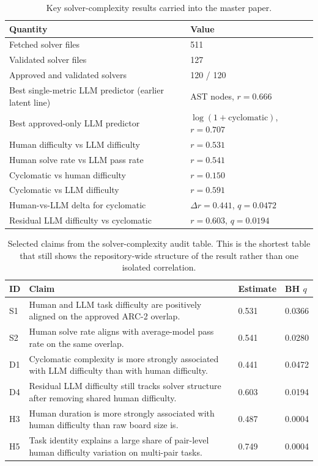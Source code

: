 \documentclass[11pt,letterpaper]{article}
\begin{document}
\begin{table}[H]
\centering
\small
\caption{Key solver-complexity results carried into the master paper.}
\begin{tabular}{p{3.25in}p{1.6in}}
\toprule
\textbf{Quantity} & \textbf{Value} \\
\midrule
Fetched solver files & 511 \\
Validated solver files & 127 \\
Approved and validated solvers & 120 / 120 \\
Best single-metric LLM predictor (earlier latent line) & AST nodes, $r = 0.666$ \\
Best approved-only LLM predictor & $\log(1 + \mathrm{cyclomatic})$, $r = 0.707$ \\
Human difficulty vs LLM difficulty & $r = 0.531$ \\
Human solve rate vs LLM pass rate & $r = 0.541$ \\
Cyclomatic vs human difficulty & $r = 0.150$ \\
Cyclomatic vs LLM difficulty & $r = 0.591$ \\
Human-vs-LLM delta for cyclomatic & $\Delta r = 0.441$, $q = 0.0472$ \\
Residual LLM difficulty vs cyclomatic & $r = 0.603$, $q = 0.0194$ \\
\bottomrule
\end{tabular}
\end{table}

\begin{table}[H]
\centering
\scriptsize
\caption{Selected claims from the solver-complexity audit table. This is the shortest table that still shows the repository-wide structure of the result rather than one isolated correlation.}
\begin{tabular}{p{0.5in}p{3.1in}p{0.7in}p{0.7in}}
\toprule
\textbf{ID} & \textbf{Claim} & \textbf{Estimate} & \textbf{BH $q$} \\
\midrule
S1 & Human and LLM task difficulty are positively aligned on the approved ARC-2 overlap. & 0.531 & 0.0366 \\
S2 & Human solve rate aligns with average-model pass rate on the same overlap. & 0.541 & 0.0280 \\
D1 & Cyclomatic complexity is more strongly associated with LLM difficulty than with human difficulty. & 0.441 & 0.0472 \\
D4 & Residual LLM difficulty still tracks solver structure after removing shared human difficulty. & 0.603 & 0.0194 \\
H3 & Human duration is more strongly associated with human difficulty than raw board size is. & 0.487 & 0.0004 \\
H5 & Task identity explains a large share of pair-level human difficulty variation on multi-pair tasks. & 0.749 & 0.0004 \\
\bottomrule
\end{tabular}
\end{table}
\end{document}
